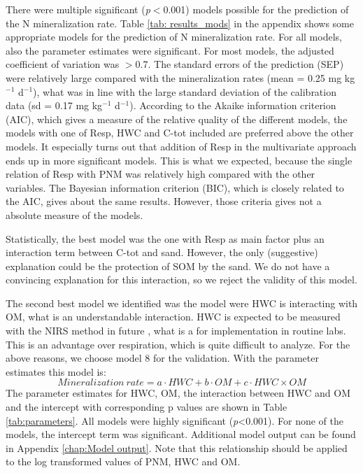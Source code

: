 \documentclass[10pt,twoside,dutch,english]{report}
\begin{document}
There were multiple significant  (\textit{p}$<$0.001) models possible for the prediction of the N mineralization rate. Table \ref{tab: results_mods} in the appendix shows some appropriate models for the prediction of N mineralization rate. For all models, also the parameter estimates were significant. For most models, the adjusted coefficient of variation was $>$0.7. The standard errors of the prediction (SEP) were  relatively large compared with the mineralization rates (mean = 0.25 mg kg$^{-1}$ d$^{-1}$), what was in line with the large standard deviation of the calibration data (sd = 0.17 mg kg$^{-1}$ d$^{-1}$).  According to the Akaike information criterion (AIC), which gives a measure of the relative quality of the different models, the models with one of Resp, HWC and C-tot included are preferred above the other models.  It especially turns out that addition of Resp in the multivariate approach ends up in more significant models. This is what we expected, because the single relation of Resp with PNM was relatively high compared with the other variables. The Bayesian information criterion (BIC), which is closely related to the AIC, gives about the same results. However, those criteria gives not a absolute measure of the models. 

Statistically, the best model was the one with Resp as main factor plus an interaction term between C-tot and sand. However, the only (suggestive) explanation could be the protection of SOM by the sand.  We do not have a convincing explanation for this interaction, so we reject the validity of this model. 

 The second best model we identified was the model were HWC is interacting with OM, what is an understandable interaction.  HWC is expected to be measured with the NIRS method in future \citep{Vasques2009}, what is a for implementation in routine labs. This is an advantage over respiration, which is quite difficult to analyze. For the above reasons, we choose model 8 for the validation. With the parameter estimates this model is: 
\begin{equation} %
Mineralization\  rate = a\cdot HWC +b\cdot OM +c\cdot HWC\times OM
\label{eq: model}
\end{equation}
The parameter estimates for HWC, OM, the interaction between HWC and OM and the intercept with corresponding p values are shown in Table \ref{tab:parameters}. All models were highly significant (\textit{p}<0.001). For none of the models, the intercept term was significant. Additional model output can be found in Appendix \ref{chap:Model output}. Note that this relationship should be applied to the log transformed values of PNM, HWC and OM. 
\end{document}
